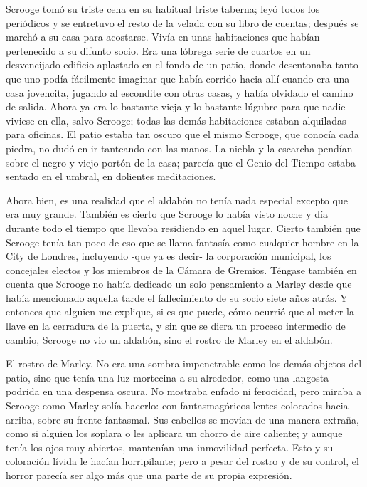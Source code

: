 \documentclass{novela}
\begin{document}
 Scrooge tomó su triste cena en su habitual triste taberna; leyó todos los periódicos y se entretuvo el resto de la velada con su libro de cuentas; después se marchó a su casa para acostarse. Vivía en unas habitaciones que habían pertenecido a su difunto socio. Era una lóbrega serie de cuartos en un desvencijado edificio aplastado en el fondo de un patio, donde desentonaba tanto que uno podía fácilmente imaginar que había corrido hacia allí cuando era una casa jovencita, jugando al escondite con otras casas, y había olvidado el camino de salida. Ahora ya era lo bastante vieja y lo bastante lúgubre para que nadie viviese en ella, salvo Scrooge; todas las demás habitaciones estaban alquiladas para oficinas. El patio estaba tan oscuro que el mismo Scrooge, que conocía cada piedra, no dudó en ir tanteando con las manos. La niebla y la escarcha pendían sobre el negro y viejo portón de la casa; parecía que el Genio del Tiempo estaba sentado en el umbral, en dolientes meditaciones.

 Ahora bien, es una realidad que el aldabón no tenía nada especial excepto que era muy grande. También es cierto que Scrooge lo había visto noche y día durante todo el tiempo que llevaba residiendo en aquel lugar. Cierto también que Scrooge tenía tan poco de eso que se llama fantasía como cualquier hombre en la City de Londres, incluyendo -que ya es decir- la corporación municipal, los concejales electos y los miembros de la Cámara de Gremios. Téngase también en cuenta que Scrooge no había dedicado un solo pensamiento a Marley desde que había mencionado aquella tarde el fallecimiento de su socio siete años atrás. Y entonces que alguien me explique, si es que puede, cómo ocurrió que al meter la llave en la cerradura de la puerta, y sin que se diera un proceso intermedio de cambio, Scrooge no vio un aldabón, sino el rostro de Marley en el aldabón.

 El rostro de Marley. No era una sombra impenetrable como los demás objetos del patio, sino que tenía una luz mortecina a su alrededor, como una langosta podrida en una despensa oscura. No mostraba enfado ni ferocidad, pero miraba a Scrooge como Marley solía hacerlo: con fantasmagóricos lentes colocados hacia arriba, sobre su frente fantasmal. Sus cabellos se movían de una manera extraña, como si alguien los soplara o les aplicara un chorro de aire caliente; y aunque tenía los ojos muy abiertos, mantenían una inmovilidad perfecta. Esto y su coloración lívida le hacían horripilante; pero a pesar del rostro y de su control, el horror parecía ser algo más que una parte de su propia expresión.
\end{document}
